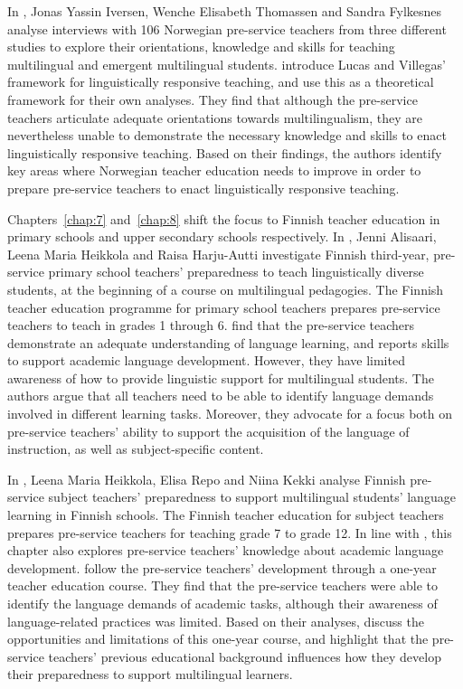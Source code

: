 \documentclass[output=paper]{langscibook}
\begin{document}
In , Jonas Yassin Iversen, Wenche Elisabeth Thomassen and Sandra Fylkesnes analyse interviews with 106 Norwegian pre-service teachers from three different studies to explore their orientations, knowledge and skills for teaching multilingual and emergent multilingual students. \citeauthor{chapters/6_iversen} introduce Lucas and Villegas’ framework for linguistically responsive teaching, and use this as a theoretical framework for their own analyses. They find that although the pre-service teachers articulate adequate orientations towards multilingualism, they are nevertheless unable to demonstrate the necessary knowledge and skills to enact linguistically responsive teaching. Based on their findings, the authors identify key areas where Norwegian teacher education needs to improve in order to prepare pre-service teachers to enact linguistically responsive teaching.

Chapters~\ref{chap:7} and~\ref{chap:8} shift the focus to Finnish teacher education in primary schools and upper secondary schools respectively. In , Jenni Alisaari, Leena Maria Heikkola and Raisa Harju-Autti investigate Finnish third-year, pre-service primary school teachers’ preparedness to teach linguistically diverse students, at the beginning of a course on multilingual pedagogies. The Finnish teacher education programme for primary school teachers prepares pre-service teachers to teach in grades 1 through 6. \citeauthor{chapters/7_alisaari} find that the pre-service teachers demonstrate an adequate understanding of language learning, and reports skills to support academic language development. However, they have limited awareness of how to provide linguistic support for multilingual students. The authors argue that all teachers need to be able to identify language demands involved in different learning tasks. Moreover, they advocate for a focus both on pre-service teachers’ ability to support the acquisition of the language of instruction, as well as subject-specific content.

In , Leena Maria Heikkola, Elisa Repo and Niina Kekki analyse Finnish pre-service subject teachers’ preparedness to support multilingual students’ language learning in Finnish schools. The Finnish teacher education for subject teachers prepares pre-service teachers for teaching grade 7 to grade 12. In line with \citeauthor{chapters/7_alisaari}, this chapter also explores pre-service teachers’ knowledge about academic language development. \citeauthor{chapters/8_heikkola} follow the pre-service teachers’ development through a one-year teacher education course. They find that the pre-service teachers were able to identify the language demands of academic tasks, although their awareness of language-related practices was limited. Based on their analyses, \citeauthor{chapters/8_heikkola} discuss the opportunities and limitations of this one-year course, and highlight that the pre-service teachers’ previous educational background influences how they develop their preparedness to support multilingual learners. 
\end{document}
